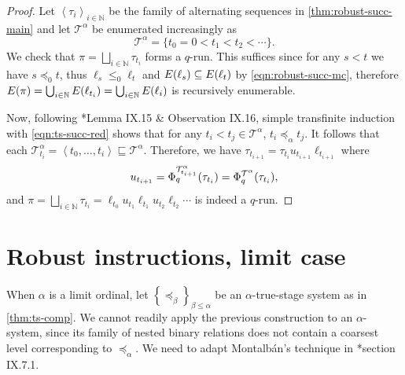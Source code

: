 \documentclass[11pt]{article}
\theoremstyle{plain}
\theoremstyle{definition}
\newcommand{\tuple}[1]{\left\langle #1 \right\rangle}
\begin{document}
\begin{proof}
  Let $\tuple{\tau_i}_{i \in \mathbb{N}}$ be the family of alternating sequences in \autoref{thm:robust-succ-main} and let $\mathcal{T}^\alpha$ be enumerated increasingly as
  \[\mathcal{T}^\alpha = \{t_0 = 0 < t_1 < t_2 < \cdots\}.\]
  We check that $\pi = \bigsqcup_{i \in \mathbb{N}} \tau_{t_i}$ forms a $q$-run. This suffices since for any $s < t$ we have $s \preceq_0 t$, thus $\ell_s \leq_0 \ell_t$ and $E\mleft(\ell_s\mright) \subseteq E\mleft(\ell_t\mright)$ by \autoref{eqn:robust-succ-mc}, therefore $E\mleft(\pi\mright) = \bigcup_{i \in \mathbb{N}} E\mleft(\ell_{t_i}\mright) = \bigcup_{i \in \mathbb{N}} E\mleft(\ell_i\mright)$ is recursively enumerable.

  Now, following \cite{montalban26-computable-structure}*{Lemma IX.15 \& Observation IX.16}, simple transfinite induction with \autoref{eqn:ts-succ-red} shows that for any $t_i < t_j \in \mathcal{T}^\alpha$, $t_i \preceq_\alpha t_j$. It follows that each $\mathcal{T}^\alpha_{t_i} = \tuple{t_0, \ldots, t_i} \sqsubseteq \mathcal{T}^\alpha$. Therefore, we have $\tau_{t_{i + 1}} = \tau_{t_i} u_{t_{i + 1}} \ell_{t_{i + 1}}$ where
  \[u_{t_{i + 1}} = \Phi_q^{\mathcal{T}^\alpha_{t_{i + 1}}}\mleft(\tau_{t_i}\mright) = \Phi_q^{\mathcal{T}^\alpha}\mleft(\tau_{t_i}\mright),\]
  and $\pi = \bigsqcup_{i \in \mathbb{N}} \tau_{t_i} = \ell_{t_0} u_{t_1} \ell_{t_1} u_{t_2} \ell_{t_2} \cdots$ is indeed a $q$-run.
\end{proof}

\section{Robust instructions, limit case}
\label{sec:robust-limit}

When $\alpha$ is a limit ordinal, let $\left\{\preceq_\beta\right\}_{\beta \leq \alpha}$ be an $\alpha$-true-stage system as in \autoref{thm:ts-comp}. We cannot readily apply the previous construction to an $\alpha$-system, since its family of nested binary relations does not contain a coarsest level corresponding to $\preceq_\alpha$. We need to adapt Montalb\'an's technique in \cite{montalban26-computable-structure}*{section IX.7.1}.
\end{document}

